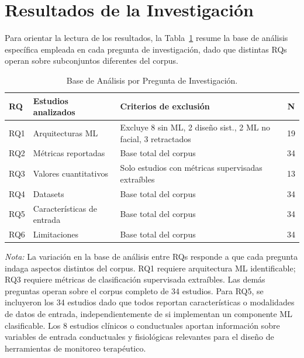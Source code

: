 \documentclass[3p,twocolumn,times]{elsarticle}
\begin{document}
	\section{Resultados de la Investigación}\label{sec4}
	
	Para orientar la lectura de los resultados, la Tabla~\ref{tab6} resume la base
	de análisis específica empleada en cada pregunta de investigación, dado que
	distintas RQs operan sobre subconjuntos diferentes del corpus.
	
	\begin{table}[!ht]
		\centering
		\caption{Base de Análisis por Pregunta de Investigación.}\label{tab6}
		\begin{tabular}{lp{1.8cm}p{3.5cm}c}
			\toprule
			\textbf{RQ} & \textbf{Estudios analizados} & \textbf{Criterios de exclusión} & \textbf{N} \\
			\midrule
			RQ1 & Arquitecturas ML & Excluye 8 sin ML, 2 diseño sist., 2 ML no facial, 3 retractados & 19 \\
			RQ2 & Métricas reportadas & Base total del corpus & 34 \\
			RQ3 & Valores cuantitativos & Solo estudios con métricas supervisadas extraíbles & 13 \\
			RQ4 & Datasets & Base total del corpus & 34 \\
			RQ5 & Características de entrada & Base total del corpus & 34 \\
			RQ6 & Limitaciones & Base total del corpus & 34 \\
			\bottomrule
		\end{tabular}
		\begin{minipage}{\columnwidth}
			\vspace{6pt}
			\small\textit{Nota:} La variación en la base de análisis entre RQs responde a que
			cada pregunta indaga aspectos distintos del corpus. RQ1 requiere arquitectura ML
			identificable; RQ3 requiere métricas de clasificación supervisada extraíbles. Las
			demás preguntas operan sobre el corpus completo de 34 estudios. Para RQ5, se
			incluyeron los 34 estudios dado que todos reportan características o modalidades
			de datos de entrada, independientemente de si implementan un componente ML
			clasificable. Los 8 estudios clínicos o conductuales aportan información sobre
			variables de entrada conductuales y fisiológicas relevantes para el diseño de
			herramientas de monitoreo terapéutico.
		\end{minipage}
	\end{table}
	
\end{document}
